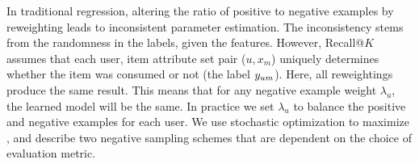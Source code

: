 In traditional regression, altering the ratio of positive to negative examples
by reweighting leads to inconsistent parameter estimation. The inconsistency
stems from the randomness in the labels, given the features. However, Recall@$K$ assumes that each user, item attribute set pair ($u, x_m$) uniquely determines
whether the item was consumed or not (the label $y_{um}$). Here, all reweightings
produce the same result. This means that for any negative example weight
$\lambda_u$, the learned model will be the same. In practice we set $\lambda_u$
to balance the positive and negative examples for each user. We use stochastic
optimization to maximize , and describe two negative sampling
schemes that are dependent on the choice of evaluation metric.
